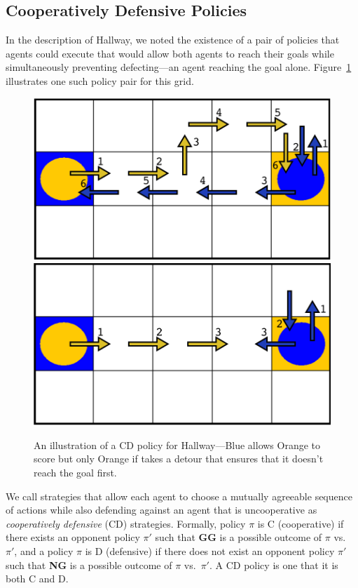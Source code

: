 \documentclass[letterpaper]{article}
\begin{document}
\subsection{Cooperatively Defensive Policies}

In the description of Hallway, we noted the existence of a
pair of policies that agents could execute that would allow both
agents to reach their goals while simultaneously preventing
defecting---an agent reaching the goal alone. Figure~\ref{f:CD}
illustrates one such policy pair for this grid.

\begin{figure}
\centering
\includegraphics[width=0.71\columnwidth]{figures/Hall_CDs/CD_fig2.png}
\includegraphics[width=0.71\columnwidth]{figures/Hall_CDs/CD_fig3.png}
\caption{An illustration of a CD policy for Hallway---Blue allows
Orange to score but only Orange if takes a detour that ensures that it
doesn't reach the goal first.}
\label{f:CD}
\end{figure}

We call strategies that allow each agent to choose a mutually
agreeable sequence of actions while also defending against an agent that is
uncooperative as \emph{cooperatively defensive} (CD)
strategies. Formally, policy $\pi$ is C (cooperative) if there exists an opponent
policy $\pi'$ such that {\bf GG} is a possible outcome of $\pi$ vs.\
$\pi'$, and a policy $\pi$ is D (defensive) if there does not exist an opponent
policy $\pi'$ such that {\bf NG} is a possible outcome of $\pi$ vs.\
$\pi'$. A CD policy is one that it is both C and D.
\end{document}

